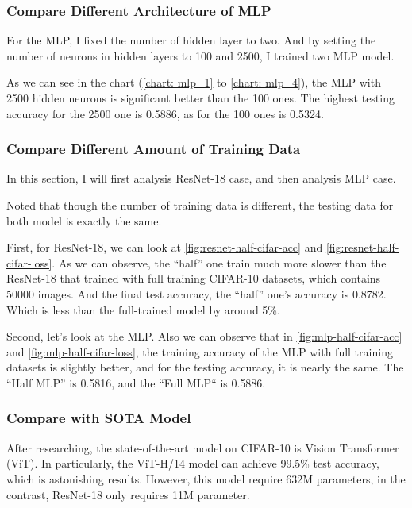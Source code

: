 \documentclass[twocolumn]{extarticle}
\begin{document}
\subsubsection{Compare Different Architecture of MLP}

For the MLP, I fixed the number of hidden layer to two. And by setting the number of neurons in hidden layers to 100 and 2500, I trained two MLP model.

As we can see in the chart (\autoref{chart: mlp_1} to \autoref{chart: mlp_4}), the MLP with 2500 hidden neurons is significant better than the 100 ones. The highest testing accuracy for the 2500 one is 0.5886, as for the 100 ones is 0.5324.

\subsubsection{Compare Different Amount of Training Data}

In this section, I will first analysis ResNet-18 case, and then analysis MLP case. 

Noted that though the number of training data is different, the testing data for both model is exactly the same.

First, for ResNet-18, we can look at \autoref{fig:resnet-half-cifar-acc} and \autoref{fig:resnet-half-cifar-loss}. As we can observe, the ``half'' one train much more slower than the ResNet-18 that trained with full training CIFAR-10 datasets, which contains 50000 images. And the final test accuracy, the ``half'' one's accuracy is 0.8782. Which is less than the full-trained model by around 5\%.

Second, let's look at the MLP. Also we can observe that in \autoref{fig:mlp-half-cifar-acc} and \autoref{fig:mlp-half-cifar-loss}, the training accuracy of the MLP with full training datasets is slightly better, and for the testing accuracy, it is nearly the same. The ``Half MLP'' is 0.5816, and the ``Full MLP`` is 0.5886.

\subsubsection{Compare with SOTA Model}

After researching, the state-of-the-art model on CIFAR-10 is Vision Transformer (ViT). In particularly, the ViT-H/14 model can achieve 99.5\% test accuracy, which is astonishing results. However, this model require 632M parameters, in the contrast, ResNet-18 only requires 11M parameter.
\end{document}
